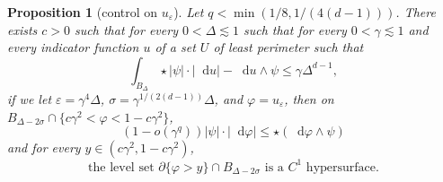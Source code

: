 \documentclass[reqno,12pt,letterpaper]{amsart}
\newcommand*\dif{\mathop{}\!\mathrm{d}}
\newtheorem{proposition}[theorem]{Proposition}
\theoremstyle{definition}
\numberwithin{equation}{section}
\begin{document}
\begin{proposition}[control on $u_\varepsilon$]\label{main mollifier lemma}
Let $q < \min(1/8, 1/(4(d - 1)))$. There exists $c > 0$ such that for every $0 < \Delta \lesssim 1$ such that for every $0 < \gamma \lesssim 1$ and every indicator function $u$ of a set $U$ of least perimeter such that
\begin{equation}\label{hypothesis on main mollifier lemma}
\int_{B_\Delta} \star |\psi| \cdot |\dif u| - \dif u \wedge \psi \leq \gamma \Delta^{d - 1},
\end{equation}
if we let $\varepsilon = \gamma^4\Delta$, $\sigma = \gamma^{1/(2(d - 1))}\Delta$, and $\varphi = u_\varepsilon$, then on $B_{\Delta - 2\sigma} \cap \{c\gamma^2 < \varphi < 1 - c\gamma^2\}$,
\begin{equation}\label{claim on main mollifier lemma}
(1 - o(\gamma^q)) |\psi| \cdot |\dif \varphi| \leq \star(\dif \varphi \wedge \psi)
\end{equation}
and for every $y \in (c\gamma^2, 1 - c\gamma^2)$,
\begin{equation}\label{claim 2 on main mollifier lemma}
\text{the level set } \partial \{\varphi > y\} \cap B_{\Delta - 2\sigma} \text{ is a }C^1\text{ hypersurface}.
\end{equation}
\end{proposition}
\end{document}
